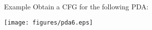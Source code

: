 \documentclass{prosper}%
\newcommand{\e} {{\mbox{$\epsilon$}}}
\newcommand{\ra}{\mbox{$\;\rightarrow\;$}}
\newcommand{\dra}{\mbox{$\;\Rightarrow\;$}}
\newcommand{\qed}{{$\;\;\Box$}}
\begin{document}








\begin{slide}{Example}
Obtain a CFG for the following PDA:
\begin{center}
\texttt{[image: figures/pda6.eps]}
\end{center}
\end{slide}
\end{document}
